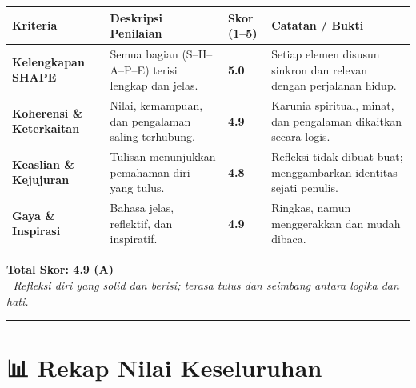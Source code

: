 \documentclass[
  letterpaper,
  DIV=11,
  numbers=noendperiod]{scrreprt}
\begin{document}
\begin{longtable}[]{@{}
  >{\raggedright\arraybackslash}p{}
  >{\raggedright\arraybackslash}p{}
  >{\raggedright\arraybackslash}p{}
  >{\raggedright\arraybackslash}p{}@{}}
\toprule\noalign{}
\begin{minipage}[b]{\linewidth}\raggedright
\textbf{Kriteria}
\end{minipage} & \begin{minipage}[b]{\linewidth}\raggedright
\textbf{Deskripsi Penilaian}
\end{minipage} & \begin{minipage}[b]{\linewidth}\raggedright
\textbf{Skor (1--5)}
\end{minipage} & \begin{minipage}[b]{\linewidth}\raggedright
\textbf{Catatan / Bukti}
\end{minipage} \\
\midrule\noalign{}
\endhead
\bottomrule\noalign{}
\endlastfoot
\textbf{Kelengkapan SHAPE} & Semua bagian (S--H--A--P--E) terisi lengkap
dan jelas. & \textbf{5.0} & Setiap elemen disusun sinkron dan relevan
dengan perjalanan hidup. \\
\textbf{Koherensi \& Keterkaitan} & Nilai, kemampuan, dan pengalaman
saling terhubung. & \textbf{4.9} & Karunia spiritual, minat, dan
pengalaman dikaitkan secara logis. \\
\textbf{Keaslian \& Kejujuran} & Tulisan menunjukkan pemahaman diri yang
tulus. & \textbf{4.8} & Refleksi tidak dibuat-buat; menggambarkan
identitas sejati penulis. \\
\textbf{Gaya \& Inspirasi} & Bahasa jelas, reflektif, dan inspiratif. &
\textbf{4.9} & Ringkas, namun menggerakkan dan mudah dibaca. \\
\end{longtable}

\textbf{Total Skor: 4.9 (A)}\\
📝 \emph{Refleksi diri yang solid dan berisi; terasa tulus dan seimbang
antara logika dan hati.}

\begin{center}\rule{0.5\linewidth}{0.5pt}\end{center}

\section{\texorpdfstring{📊 \textbf{Rekap Nilai
Keseluruhan}}{📊 Rekap Nilai Keseluruhan}}\label{rekap-nilai-keseluruhan}
\end{document}
